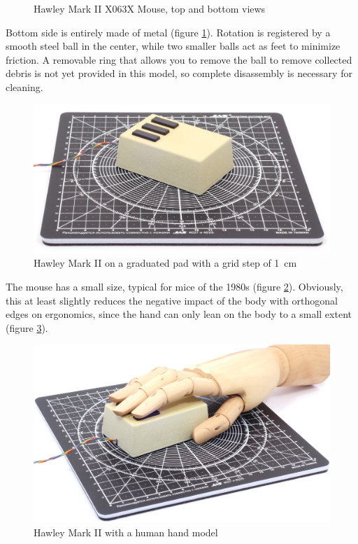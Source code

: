 \documentclass[11pt, a4paper]{article}
\begin{document}
\begin{figure}[h]
    \caption{Hawley Mark II X063X Mouse, top and bottom views}
    \label{fig:HawleyMarkIITopAndBottom}
\end{figure}



Bottom side is entirely made of metal (figure \ref{fig:HawleyMarkIITopAndBottom}). Rotation is registered by a smooth steel ball in the center, while two smaller balls act as feet to minimize friction. A removable ring that allows you to remove the ball to remove collected debris is not yet provided in this model, so complete disassembly is necessary for cleaning.

\begin{figure}[h]
    \centering
    \includegraphics[scale=0.5]{1983_hawley_mark_ii/size_30.jpg}
    \caption{Hawley Mark II on a graduated pad with a grid step of 1~cm}
    \label{fig:HawleyMarkIISize}
\end{figure}

The mouse has a small size, typical for mice of the 1980s (figure \ref{fig:HawleyMarkIISize}). Obviously, this at least slightly reduces the negative impact of the body with orthogonal edges on ergonomics, since the hand can only lean on the body to a small extent (figure \ref{fig:HawleyMarkIIHand}).

\begin{figure}[h]
    \centering
    \includegraphics[scale=0.5]{1983_hawley_mark_ii/hand_60.jpg}
    \caption{Hawley Mark II with a human hand model}
    \label{fig:HawleyMarkIIHand}
\end{figure}
\end{document}

